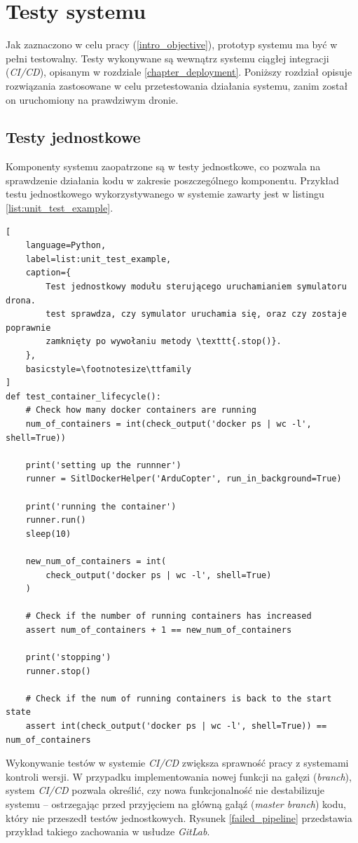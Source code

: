 \chapter{Testy systemu} \label{chapter_tests}

Jak zaznaczono w celu pracy (\ref{intro_objective}), prototyp systemu
ma być w pełni testowalny. Testy wykonywane są wewnątrz systemu ciągłej integracji 
(\textit{CI/CD}), opisanym w rozdziale \ref{chapter_deployment}. Poniższy rozdział opisuje
rozwiązania zastosowane w celu przetestowania działania systemu,
zanim został on uruchomiony na prawdziwym dronie.

\section{Testy jednostkowe}

Komponenty systemu zaopatrzone są w testy jednostkowe, co pozwala na
sprawdzenie działania kodu w zakresie poszczególnego komponentu.
Przykład testu jednostkowego wykorzystywanego w systemie
zawarty jest w listingu \ref{list:unit_test_example}.

\begin{lstlisting}[
    language=Python,
    label=list:unit_test_example,
    caption={
        Test jednostkowy modułu sterującego uruchamianiem symulatoru drona.
        test sprawdza, czy symulator uruchamia się, oraz czy zostaje poprawnie
        zamknięty po wywołaniu metody \texttt{.stop()}.
    },
    basicstyle=\footnotesize\ttfamily
]
def test_container_lifecycle():
	# Check how many docker containers are running
	num_of_containers = int(check_output('docker ps | wc -l', shell=True))

	print('setting up the runnner')
	runner = SitlDockerHelper('ArduCopter', run_in_background=True)

	print('running the container')
	runner.run()
	sleep(10)

	new_num_of_containers = int(
        check_output('docker ps | wc -l', shell=True)
    )

	# Check if the number of running containers has increased
	assert num_of_containers + 1 == new_num_of_containers

	print('stopping')
	runner.stop()

	# Check if the num of running containers is back to the start state
	assert int(check_output('docker ps | wc -l', shell=True)) == num_of_containers
\end{lstlisting}

Wykonywanie testów w systemie \textit{CI/CD} zwiększa sprawność
pracy z systemami kontroli wersji. W przypadku implementowania nowej 
funkcji na gałęzi (\textit{branch}), system \textit{CI/CD} pozwala określić,
czy nowa funkcjonalność nie destabilizuje systemu -- ostrzegając przed 
przyjęciem na główną gałąź (\textit{master branch}) kodu, który nie przeszedł
testów jednostkowych. Rysunek \ref{failed_pipeline} przedstawia przykład
takiego zachowania w usłudze \textit{GitLab}.

